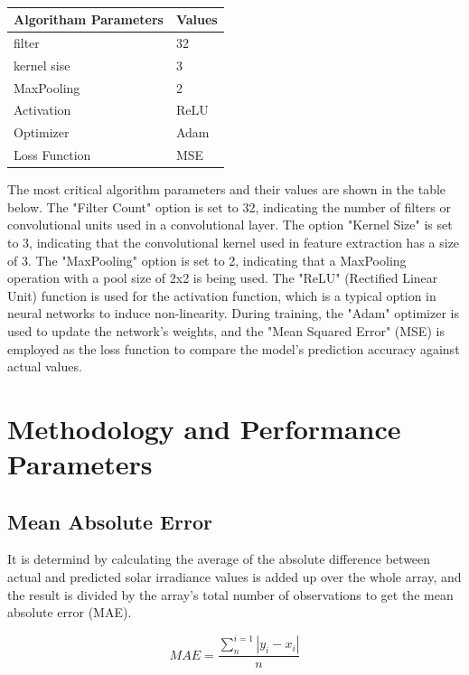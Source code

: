 \documentclass[a4paper,fleqn]{cas-sc}
\begin{document}
\begin{table}[!ht]
  \centering
  \caption{}
  \label{Algorithm Parameters-table}
  \begin{tabular}{|p{}| p{}|}
  \hline
  Algoritham Parameters & Values      \\ \hline
  filter        & 32   \\
  kernel sise   & 3    \\
  MaxPooling    & 2    \\
  Activation    & ReLU \\
  Optimizer     & Adam \\
  Loss Function & MSE  \\ \hline
  \end{tabular}
  \end{table}


  The most critical algorithm parameters and their values are shown in the table below. The "Filter Count" option is set to 32, indicating the number of filters or convolutional units used in a convolutional layer. The option "Kernel Size" is set to 3, indicating that the convolutional kernel used in feature extraction has a size of 3. The "MaxPooling" option is set to 2, indicating that a MaxPooling operation with a pool size of 2x2 is being used. The "ReLU" (Rectified Linear Unit) function is used for the activation function, which is a typical option in neural networks to induce non-linearity. During training, the "Adam" optimizer is used to update the network's weights, and the "Mean Squared Error" (MSE) is employed as the loss function to compare the model's prediction accuracy against actual values.

  \section{Methodology and Performance Parameters}

  \subsection{Mean Absolute Error}
  It is determind by calculating the average of the absolute difference between actual and predicted solar irradiance
  values is added up over the whole array, and the result is divided by the array’s total number of observations to get the mean absolute error (MAE)\cite{kumari2021deep}.
  
  \begin{equation}
  MAE = \frac{\sum_{n}^{i=1}|y_i-x_i|}{n}
  \end{equation}
  
\end{document}
